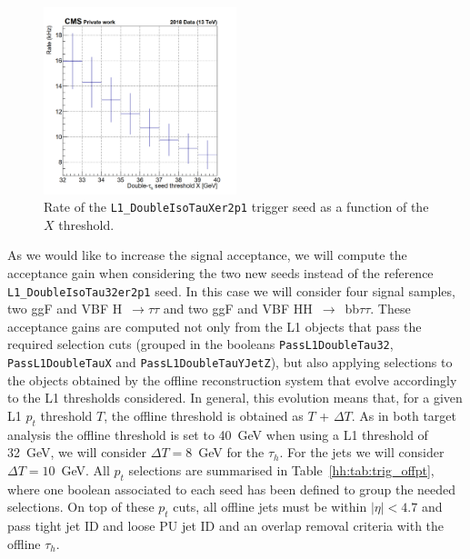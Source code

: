 \documentclass[../main.tex]{subfiles}
\begin{document}
\begin{figure}[h!]
\begin{center}
\includegraphics[width=0.5\textwidth]{Images/plot2D_ditau_sym_323755}
\end{center}
\caption{Rate of the \texttt{L1\_DoubleIsoTauXer2p1} trigger seed as a function of the $X$ threshold.}
\label{hh:fig:trig_ditau32_rate}
\end{figure}

As we would like to increase the signal acceptance, we will compute the acceptance gain when considering the two new seeds instead of the reference \texttt{L1\_Double\-IsoTau32\-er2p1} seed. In this case we will consider four signal samples, two ggF and VBF H~$\to\tau\tau$ and two ggF and VBF HH~$\to$~bb$\tau\tau$. These acceptance gains are computed not only from the L1 objects that pass the required selection cuts (grouped in the booleans \texttt{PassL1DoubleTau32}, \texttt{PassL1DoubleTauX} and \texttt{PassL1DoubleTauYJetZ}), but also applying selections to the objects obtained by the offline reconstruction system that evolve accordingly to the L1 thresholds considered. In general, this evolution means that, for a given L1 $p_t$ threshold $T$, the offline threshold is obtained as $T$ + $\Delta T$. As in both target analysis the offline threshold is set to 40~GeV when using a L1 threshold of 32~GeV, we will consider $\Delta T=8$~GeV for the $\tau_h$. For the jets we will consider $\Delta T=10$~GeV. All $p_t$ selections are summarised in Table~\ref{hh:tab:trig_offpt}, where one boolean associated to each seed has been defined to group the needed selections. On top of these $p_t$ cuts, all offline jets must be within $|\eta|<4.7$ and pass tight jet ID and loose PU jet ID and an overlap removal criteria with the offline $\tau_h$.
\end{document}
